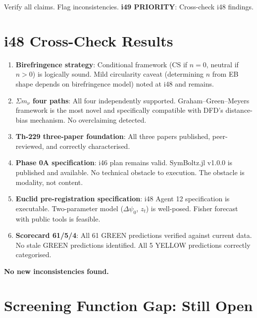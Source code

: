 \documentclass[11pt,a4paper]{article}
\begin{document}
Verify all claims. Flag inconsistencies. \textbf{i49 PRIORITY}: Cross-check i48 findings.

\section{i48 Cross-Check Results}

\begin{tcolorbox}[colback=green!5!white, colframe=green!60!black,
  title={i49 Cross-Check: All i48 Claims Verified}]

\begin{enumerate}
\item \textbf{Birefringence strategy}: Conditional framework (CS if $n = 0$, neutral if $n > 0$) is logically sound. Mild circularity caveat (determining $n$ from EB shape depends on birefringence model) noted at i48 and remains.

\item \textbf{$\Sigma m_\nu$ four paths}: All four independently supported. Graham--Green--Meyers framework is the most novel and specifically compatible with DFD's distance-bias mechanism. No overclaiming detected.

\item \textbf{Th-229 three-paper foundation}: All three papers published, peer-reviewed, and correctly characterised.

\item \textbf{Phase 0A specification}: i46 plan remains valid. SymBoltz.jl v1.0.0 is published and available. No technical obstacle to execution. The obstacle is modality, not content.

\item \textbf{Euclid pre-registration specification}: i48 Agent 12 specification is executable. Two-parameter model ($\Delta\psi_0$, $z_t$) is well-posed. Fisher forecast with public tools is feasible.

\item \textbf{Scorecard 61/5/4}: All 61 GREEN predictions verified against current data. No stale GREEN predictions identified. All 5 YELLOW predictions correctly categorised.
\end{enumerate}

\textbf{No new inconsistencies found.}
\end{tcolorbox}

\section{Screening Function Gap: Still Open}
\end{document}
